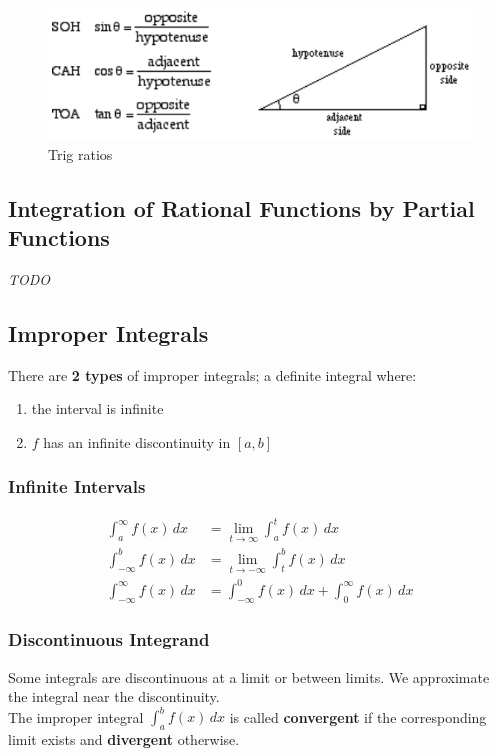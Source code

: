 \documentclass[8pt,letterpaper]{article}
\begin{document}
\begin{figure}[hbtp]
\caption{Trig ratios}
\includegraphics[scale=0.5]{soh-cah-toa.png}
\end{figure}

\subsection*{Integration of Rational Functions by Partial Functions}
\emph{TODO}

\subsection*{Improper Integrals} %
There are \textbf{2 types} of improper integrals; a definite integral where:
\begin{enumerate}
\item the interval is infinite
\item $f$ has an infinite discontinuity in $[a,b]$
\end{enumerate}

\subsubsection*{Infinite Intervals} %
\setcounter{equation}{0}
\begin{align}
\int_a^\infty f(x)\,dx &= \lim_{t \to \infty} \int_a^t f(x)\,dx \\
\int_{-\infty}^b f(x)\,dx &= \lim_{t \to -\infty} \int_t^b f(x)\,dx \\
\int_{-\infty}^\infty f(x)\,dx &= \int_{-\infty}^0 f(x)\,dx + \int_0^\infty f(x)\,dx
\end{align}

\subsubsection*{Discontinuous Integrand}
Some integrals are discontinuous at a limit or between limits.
We approximate the integral near the discontinuity.\\
The improper integral $\int_a^b f(x)\,dx$ is called \textbf{convergent} if the
corresponding limit exists and \textbf{divergent} otherwise.
\end{document}
